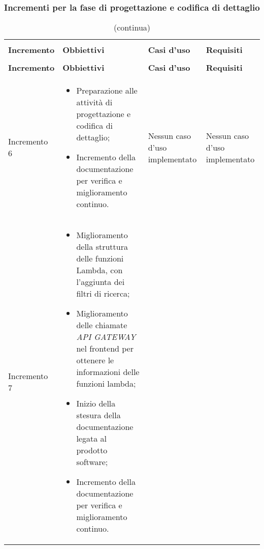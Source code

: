 \subsubsection{Incrementi per la fase di progettazione e codifica di dettaglio}
\renewcommand{\arraystretch}{1.5}
\begin{longtable}{
    >{\centering}p{}
    >{\raggedright}p{}
    >{\centering}p{}
    >{\centering}p{}
    }

    \caption{Tabella di tracciamento per la codifica di dettaglio}                                                                 \\
    \rowcolor{white}                                                                                                               \\
    \rowcolor{logo!70}
    \centering\textbf{Incremento} & \centering\textbf{Obbiettivi}  & \centering\textbf{Casi d'uso}  & \centering\textbf{Requisiti}
    \tabularnewline
    \endfirsthead
    \rowcolor{white}\caption[]{(continua)}                                                                                         \\
    \rowcolor{logo!70}
    \centering\textbf{Incremento} & \centering\textbf{Obbiettivi}  & \centering\textbf{Casi d'uso}  & \centering\textbf{Requisiti}
    \tabularnewline
    \endhead

    Incremento 6                  &
    \vspace{-15px}
    \begin{itemize}
        \renewcommand\labelitemi{-}
        \item Preparazione alle attività di progettazione e codifica di dettaglio;
        \item Incremento della documentazione per verifica e miglioramento continuo.
    \end{itemize}     & Nessun caso d'uso implementato & Nessun caso d'uso implementato
    \tabularnewline

    Incremento 7                  &
    \vspace{-15px}
    \begin{itemize}
        \renewcommand\labelitemi{-}
        \item Miglioramento della struttura delle funzioni Lambda, con l'aggiunta dei filtri di ricerca;
        \item  Miglioramento delle chiamate \textit{API GATEWAY} nel frontend per ottenere le informazioni delle funzioni lambda;
        \item Inizio della stesura della documentazione legata al prodotto software;
        \item Incremento della documentazione per verifica e miglioramento continuo.
    \end{itemize}


\end{longtable}
